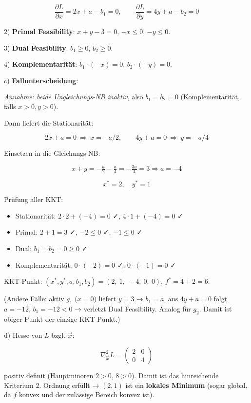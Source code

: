 \documentclass[11pt, a4paper]{article}
\begin{document}
\[
\frac{\partial L}{\partial x} = 2x + a - b_1 = 0,\qquad \frac{\partial L}{\partial y} = 4y + a - b_2 = 0
\]

2) \textbf{Primal Feasibility}: $x+y-3 = 0$, $-x \le 0$, $-y \le 0$.

3) \textbf{Dual Feasibility}: $b_1 \ge 0$, $b_2 \ge 0$.

4) \textbf{Komplementarität}: $b_1\cdot(-x) = 0$, $b_2\cdot(-y) = 0$.


c) \textbf{Fallunterscheidung}:


\textit{Annahme: beide Ungleichungs-NB inaktiv}, also $b_1 = b_2 = 0$ (Komplementarität, falls $x>0, y>0$).


Dann liefert die Stationarität:

\[
2x + a = 0\ \Rightarrow\ x = -a/2,\qquad 4y + a = 0\ \Rightarrow\ y = -a/4
\]


Einsetzen in die Gleichungs-NB:

\[
x+y = -\tfrac{a}{2} - \tfrac{a}{4} = -\tfrac{3a}{4} = 3 \Rightarrow a = -4
\]


\[
x^* = 2,\quad y^* = 1
\]


Prüfung aller KKT:

\begin{itemize}
  \item Stationarität: $2\cdot 2 + (-4) = 0$ ✓, $4\cdot 1 + (-4) = 0$ ✓
  \item Primal: $2+1=3$ ✓, $-2 \le 0$ ✓, $-1 \le 0$ ✓
  \item Dual: $b_1 = b_2 = 0 \ge 0$ ✓
  \item Komplementarität: $0\cdot(-2) = 0$ ✓, $0\cdot(-1) = 0$ ✓
\end{itemize}

KKT-Punkt: $(x^*, y^*, a, b_1, b_2) = (2,\ 1,\ -4,\ 0,\ 0)$, $f^* = 4 + 2 = 6$.


(Andere Fälle: aktiv $g_1$ ($x=0$) liefert $y=3$ → $b_1 = a$, aus $4y+a=0$ folgt $a=-12$, $b_1=-12 < 0$ → verletzt Dual Feasibility. Analog für $g_2$. Damit ist obiger Punkt der einzige KKT-Punkt.)


d) Hesse von $L$ bzgl. $\vec{x}$:

\[
\nabla^2_{\vec{x}} L = \begin{pmatrix} 2 & 0 \\ 0 & 4 \end{pmatrix}
\]

positiv definit (Hauptminoren $2>0$, $8>0$). Damit ist das hinreichende Kriterium 2. Ordnung erfüllt → $(2,1)$ ist ein \textbf{lokales Minimum} (sogar global, da $f$ konvex und der zulässige Bereich konvex ist).
\end{document}

